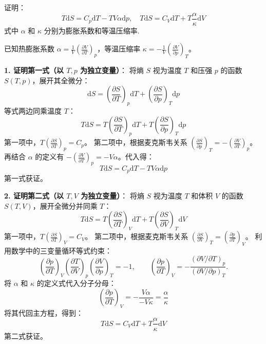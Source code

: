 \begin{exercise}\label{ex:12.13}
证明：
$$ T \mathrm{d}S = C_p \mathrm{d}T - TV\alpha \mathrm{d}p, \quad T \mathrm{d}S = C_V \mathrm{d}T + T \frac{\alpha}{\kappa} \mathrm{d}V $$
式中 $\alpha$ 和 $\kappa$ 分别为膨胀系数和等温压缩率.
\end{exercise}
\begin{solution}
已知热膨胀系数 $\alpha = \frac{1}{V}\left(\frac{\partial V}{\partial T}\right)_p$，等温压缩率 $\kappa = -\frac{1}{V}\left(\frac{\partial V}{\partial p}\right)_T$。

\textbf{1. 证明第一式（以 $T, p$ 为独立变量）}：
将熵 $S$ 视为温度 $T$ 和压强 $p$ 的函数 $S(T, p)$，展开其全微分：
$$ \mathrm{d}S = \left(\frac{\partial S}{\partial T}\right)_p \mathrm{d}T + \left(\frac{\partial S}{\partial p}\right)_T \mathrm{d}p $$
等式两边同乘温度 $T$：
$$ T\mathrm{d}S = T\left(\frac{\partial S}{\partial T}\right)_p \mathrm{d}T + T\left(\frac{\partial S}{\partial p}\right)_T \mathrm{d}p $$
第一项中，$T\left(\frac{\partial S}{\partial T}\right)_p = C_p$。
第二项中，根据麦克斯韦关系 $\left(\frac{\partial S}{\partial p}\right)_T = -\left(\frac{\partial V}{\partial T}\right)_p$。再结合 $\alpha$ 的定义有 $-\left(\frac{\partial V}{\partial T}\right)_p = -V\alpha$。代入得：
$$ T\mathrm{d}S = C_p \mathrm{d}T - T V \alpha \mathrm{d}p $$
第一式获证。

\textbf{2. 证明第二式（以 $T, V$ 为独立变量）}：
将熵 $S$ 视为温度 $T$ 和体积 $V$ 的函数 $S(T, V)$，展开全微分并同乘 $T$：
$$ T\mathrm{d}S = T\left(\frac{\partial S}{\partial T}\right)_V \mathrm{d}T + T\left(\frac{\partial S}{\partial V}\right)_T \mathrm{d}V $$
第一项中，$T\left(\frac{\partial S}{\partial T}\right)_V = C_V$。
第二项中，根据麦克斯韦关系 $\left(\frac{\partial S}{\partial V}\right)_T = \left(\frac{\partial p}{\partial T}\right)_V$。
利用数学中的三变量循环等式约束：
\[
\left(\frac{\partial p}{\partial T}\right)_V
\left(\frac{\partial T}{\partial V}\right)_p
\left(\frac{\partial V}{\partial p}\right)_T=-1,
\qquad
\left(\frac{\partial p}{\partial T}\right)_V
=-\frac{(\partial V/\partial T)_p}{(\partial V/\partial p)_T}.
\]
将 $\alpha$ 和 $\kappa$ 的定义式代入分子分母：
$$ \left(\frac{\partial p}{\partial T}\right)_V = -\frac{V \alpha}{-V \kappa} = \frac{\alpha}{\kappa} $$
将其代回主方程，得到：
$$ T\mathrm{d}S = C_V \mathrm{d}T + T \frac{\alpha}{\kappa} \mathrm{d}V $$
第二式获证。
\end{solution}

